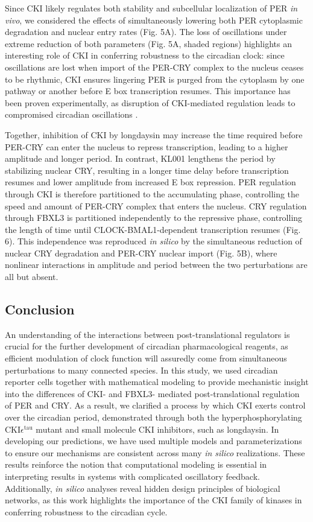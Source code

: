 Since CKI likely regulates both stability and subcellular localization of PER
{\it in vivo}, we considered the effects of simultaneously lowering both PER
cytoplasmic degradation and nuclear entry rates (Fig. 5A).  The loss of
oscillations under extreme reduction of both parameters (Fig. 5A, shaded
regions) highlights an interesting role of CKI in conferring robustness to the
circadian clock: since oscillations are lost when import of the PER-CRY complex
to the nucleus ceases to be rhythmic, CKI ensures lingering PER is purged from
the cytoplasm by one pathway or another before E box transcription resumes.
This importance has been proven experimentally, as disruption of CKI-mediated
regulation leads to compromised circadian oscillations \cite{Lee2009a}.

Together, inhibition of CKI by longdaysin may increase the time required
before PER-CRY can enter the nucleus to repress transcription, leading to a
higher amplitude and longer period. In contrast, KL001 lengthens the period by
stabilizing nuclear CRY, resulting in a longer time delay before transcription
resumes and lower amplitude from increased E box repression. PER regulation
through CKI is therefore partitioned to the accumulating phase, controlling the
speed and amount of PER-CRY complex that enters the nucleus. CRY regulation
through FBXL3 is partitioned independently to the repressive phase, controlling
the length of time until CLOCK-BMAL1-dependent transcription resumes (Fig. 6). This
independence was reproduced {\it in silico} by the simultaneous reduction of
nuclear CRY degradation and PER-CRY nuclear import (Fig. 5B), where nonlinear
interactions in amplitude and period between the two perturbations are all but
absent.

\subsection{Conclusion}
An understanding of the interactions between post-translational regulators is
crucial for the further development of circadian pharmacological reagents, as
efficient modulation of clock function will assuredly come from simultaneous
perturbations to many connected species. In this study, we used circadian
reporter cells together with mathematical modeling to provide mechanistic
insight into the differences of CKI- and FBXL3- mediated post-translational
regulation of PER and CRY. As a result, we clarified a process by which CKI
exerts control over the circadian period, demonstrated through both the
hyperphosphorylating CKI$\epsilon^\mathrm{tau}$ mutant and small molecule CKI
inhibitors, such as longdaysin. In developing our predictions, we have used
multiple models and parameterizations to ensure our mechanisms are consistent
across many {\it in silico} realizations. These results reinforce the notion
that computational modeling is essential in interpreting results in systems
with complicated oscillatory feedback. Additionally, {\it in silico} analyses
reveal hidden design principles of biological networks, as this work highlights
the importance of the CKI family of kinases in conferring robustness to the
circadian cycle. 
 

